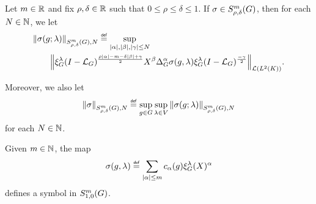 \begin{definition}
    Let $m \in \mathbb{R}$ and fix $\rho, \delta \in \mathbb{R}$ such that $0 \leq \rho \leq \delta \leq 1$.
    If $\sigma \in S^{m}_{\rho, \delta}(G)$,
    then for each $N \in \mathbb{N}$,
    we let
    \begin{align*}
        &\SymbolSemiNorm m {\rho, \delta} N {\sigma(g; \lambda)}
        \defeq
        \sup_{\abs \alpha, \abs \beta, \abs \gamma \leq N}
        \\
        &\qquad
        \norm [\Lin{\Lebesgue 2 \CompactGroup}] {%
            \Rep{\lambda} \BesselPotential{\rho \abs\alpha - m - \delta \abs\beta + \gamma} \LeftDifferentialOperator{\beta} \DifferenceOperatorOrder{\alpha} \sigma(g, \lambda) \Rep{\lambda} \BesselPotential{-\gamma}
        }.
    \end{align*}

    Moreover, we also let
    \begin{align*}
        \SymbolSemiNorm m {\rho, \delta} N \sigma
        \defeq \sup_{g \in \Group} \sup_{\lambda \in \VectorSpace}
        \SymbolSemiNorm m {\rho, \delta} N {\sigma(g; \lambda)}
    \end{align*}
    for each $N \in \mathbb{N}$.
\end{definition}

\begin{example}
    Given $m \in \mathbb{N}$,
    the map
    \begin{align*}
        \sigma(g, \lambda) \defeq \sum_{\abs \alpha \leq m} c_\alpha(g) \Rep \lambda(X)^\alpha
    \end{align*}
    defines a symbol in $S^{m}_{1, 0}(G)$.
\end{example}

